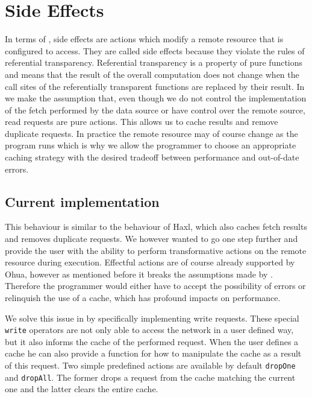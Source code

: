 \chapter{Side Effects}
\label{ch:side-effects}

In terms of \yauhau{}, side effects are actions which modify a remote resource that \yauhau{} is configured to access.
They are called side effects because they violate the rules of referential transparency.
Referential transparency is a property of pure functions and means that the result of the overall computation does not change when the call sites of the referentially transparent functions are replaced by their result.
In \yauhau{} we make the assumption that, even though we do not control the implementation of the fetch performed by the data source or have control over the remote source, read requests are pure actions.
This allows us to cache results and remove duplicate requests.
In practice the remote resource may of course change as the program runs which is why we allow the programmer to choose an appropriate caching strategy with the desired tradeoff between performance and out-of-date errors.

\section{Current implementation}

This behaviour is similar to the behaviour of Haxl, which also caches fetch results and removes duplicate requests.
We however wanted to go one step further and provide the user with the ability to perform transformative actions on the remote resource during execution.
Effectful actions are of course already supported by Ohua, however as mentioned before it breaks the assumptions made by \yauhau{}.
Therefore the programmer would either have to accept the possibility of errors or relinquish the use of a cache, which has profound impacts on performance.

We solve this issue in \yauhau{} by specifically implementing write requests.
These special \texttt{write} operators are not only able to access the network in a user defined way, but it also informs the cache of the performed request.
When the user defines a cache he can also provide a function for how to manipulate the cache as a result of this request.
Two simple predefined actions are available by default \texttt{dropOne} and \texttt{dropAll}.
The former drops a request from the cache matching the current one and the latter clears the entire cache.

